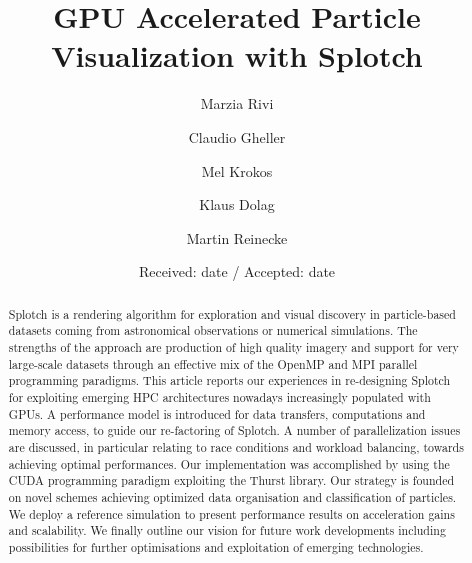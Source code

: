 \documentclass[smallextended]{svjour3}
\begin{document}
\title{GPU Accelerated Particle Visualization with Splotch}
\author{Marzia Rivi \and
	Claudio Gheller \and
	Mel Krokos  \and
	Klaus Dolag \and
        Martin Reinecke
}


\date{Received: date / Accepted: date}
\maketitle

\begin{abstract}
Splotch is a rendering algorithm for exploration and visual discovery in
particle-based datasets coming from astronomical observations or
numerical simulations. The strengths of the approach are production of
high quality imagery and support for very large-scale datasets through an
effective mix of the OpenMP and MPI parallel programming paradigms. This
article reports our experiences in re-designing Splotch for exploiting
emerging HPC architectures nowadays increasingly populated with GPUs. A
performance model is introduced for data transfers, computations and
memory access, to guide our re-factoring of Splotch.  A number of
parallelization issues are discussed, in particular relating to race
conditions and workload balancing, towards achieving optimal
performances. Our implementation was accomplished by using the CUDA
programming paradigm exploiting the Thurst library. Our strategy is
founded on novel schemes achieving optimized data organisation and
classification of particles. We deploy a reference simulation to present
performance results on acceleration gains and scalability. We finally
outline our vision for future work developments including possibilities
for further optimisations and exploitation of emerging technologies.

\end{abstract}
 
\end{document}
